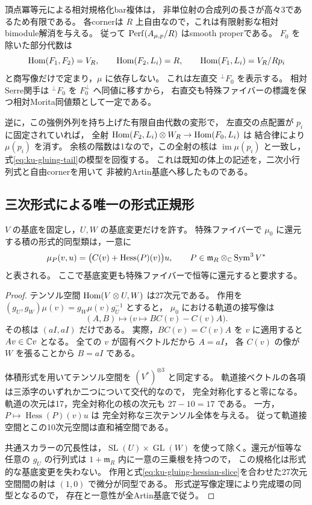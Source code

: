 頂点冪等元による相対規格化bar複体は，
非単位射の合成列の長さが高々3であるため有限である。
各cornerは $R$ 上自由なので，これは有限射影な相対bimodule解消を与える。
従って $\operatorname{Perf}(A_{\mu,p}/R)$ はsmooth properである。
$F_0$ を除いた部分代数は
\[
 \operatorname{Hom}(F_1,F_2)=V_R,\qquad
 \operatorname{Hom}(F_2,L_i)=R,\qquad
 \operatorname{Hom}(F_1,L_i)=V_R/Rp_i
\]
と商写像だけで定まり，$\mu$ に依存しない。
これは左直交 $ {}^{\perp}F_0$ を表示する。
相対Serre関手は $ {}^{\perp}F_0$ を $F_0^\perp$ へ同値に移すから，
右直交も特殊ファイバーの標識を保つ相対Morita同値類として一定である。

逆に，この強例外列を持ち上げた有限自由代数の変形で，
左直交の点配置が $p_i$ に固定されていれば，
全射 $\operatorname{Hom}(F_2,L_i)\otimes W_R\to\operatorname{Hom}(F_0,L_i)$ は
結合律により $\mu(p_i)$ を消す。
余核の階数は1なので，この全射の核は $\operatorname{im}\mu(p_i)$ と一致し，
式\eqref{eq:ku-gluing-tail}の模型を回復する。
これは既知の体上の記述を，二次小行列式と自由cornerを用いて
非被約Artin基底へ移したものである。

\subsection{三次形式による唯一の形式正規形}

\begin{lemma}
\label{lem:ku-gluing-tensor-slice}
$V$ の基底を固定し，$U,W$ の基底変更だけを許す。
特殊ファイバーで $\mu_0$ に還元する積の形式的同型類は，一意に
\begin{equation}\label{eq:ku-gluing-hessian-slice}
 \mu_P(v,u)=\bigl(C(v)+\operatorname{Hess}(P)(v)\bigr)u,
 \qquad
 P\in\mathfrak m_R\otimes_\mathbb C\operatorname{Sym}^3V^*
\end{equation}
と表される。
ここで基底変更も特殊ファイバーで恒等に還元すると要求する。
\end{lemma}

\begin{proof}
テンソル空間 $\operatorname{Hom}(V\otimes U,W)$ は27次元である。
作用を $(g_U,g_W)\mu(v)=g_W\mu(v)g_U^{-1}$ とすると，
$\mu_0$ における軌道の接写像は
\[
 (A,B)\longmapsto \bigl(v\longmapsto BC(v)-C(v)A\bigr).
\]
その核は $(aI,aI)$ だけである。
実際，$BC(v)=C(v)A$ を $v$ に適用すると $Av\in\mathbb C v$ となる。
全ての $v$ が固有ベクトルだから $A=aI$，
各 $C(v)$ の像が $W$ を張ることから $B=aI$ である。

体積形式を用いてテンソル空間を $(V^*)^{\otimes3}$ と同定する。
軌道接ベクトルの各項は三添字のいずれか二つについて交代的なので，
完全対称化すると零になる。
軌道の次元は17，完全対称化の核の次元も $27-10=17$ である。
一方，$P\mapsto\operatorname{Hess}(P)(v)u$ は
完全対称な三次テンソル全体を与える。
従って軌道接空間とこの10次元空間は直和補空間である。

共通スカラーの冗長性は，$\operatorname{SL}(U)\times\operatorname{GL}(W)$
を使って除く。還元が恒等な任意の $g_U$ の行列式は
$1+\mathfrak m_R$ 内に一意の三乗根を持つので，
この規格化は形式的な基底変更を失わない。
作用と式\eqref{eq:ku-gluing-hessian-slice}を合わせた27次元空間間の射は
$(1,0)$ で微分が同型である。
形式逆写像定理により完成環の同型となるので，
存在と一意性が全Artin基底で従う。
\end{proof}

